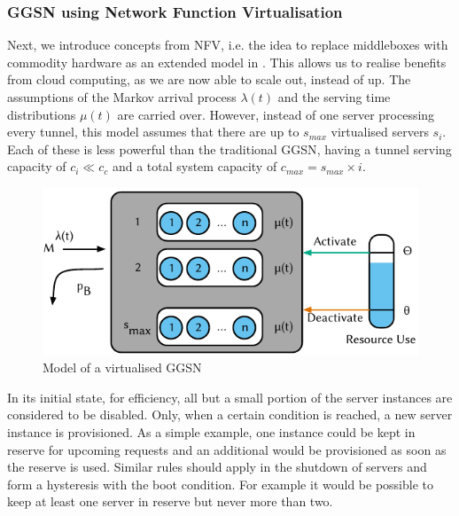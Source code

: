 \subsubsection*{GGSN using Network Function Virtualisation}\label{sec:cloud:virtualized_network_functions:model:virtual_ggsn}
Next, we introduce concepts from \gls{NFV}, i.e. the idea to replace middleboxes with commodity hardware as an extended model in . 
This allows us to realise benefits from cloud computing, as we are now able to scale out, instead of up.
The assumptions of the Markov arrival process \(\lambda(t)\) and the serving time distributions \(\mu(t)\) are carried over.
However, instead of one server processing every tunnel, this model assumes that there are up to \(s_{max}\) virtualised servers \(s_i\).
Each of these is less powerful than the traditional \gls{GGSN}, having a tunnel serving capacity of \(c_i \ll c_c\) and a total system capacity of \(c_{max} = s_{max} \times i\).

\begin{figure}
  \centering
  \includegraphics{cloud/virtualized_network_functions/model/figures/virtual_ggsn}
  \caption{Model of a virtualised GGSN}
  \label{sec:cloud:virtualized_network_functions:model:virtual_ggsn:model}
\end{figure} 

In its initial state, for efficiency, all but a small portion of the server instances are considered to be disabled.
Only, when a certain condition is reached, a new server instance is provisioned.
As a simple example, one instance could be kept in reserve for upcoming requests and an additional would be provisioned as soon as the reserve is used.
Similar rules should apply in the shutdown of servers and form a hysteresis with the boot condition.
For example it would be possible to keep at least one server in reserve but never more than two.

